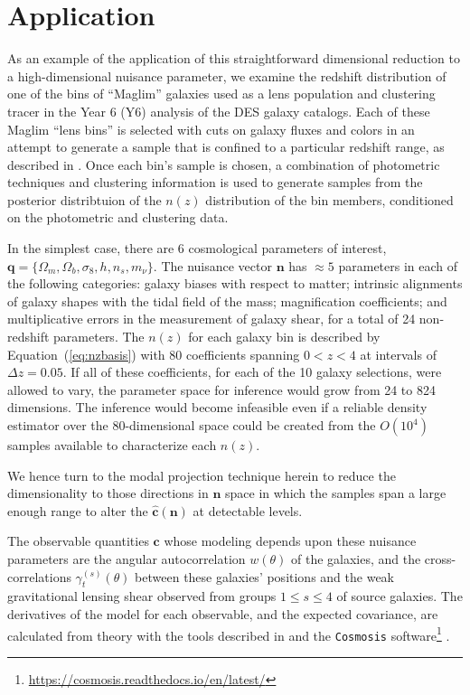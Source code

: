 \documentclass[linenumbers, onecolumn]{aastex63}
\newcommand{\eqq}[1]{Equation~(\ref{#1})}
\newcommand{\vecc}{\ensuremath{\mathbf{c}}}
\newcommand{\vecq}{\ensuremath{\mathbf{q}}}
\newcommand{\vecn}{\ensuremath{\mathbf{n}}}
\newcommand{\hatc}{\ensuremath{\hat{\mathbf{c}}}}
\begin{document}
\section{Application}\label{sec:app}
As an example of the application of this straightforward dimensional
reduction to a high-dimensional nuisance parameter, we examine the
redshift distribution of one of the bins of ``Maglim''  galaxies used
as a lens population and clustering tracer in the Year 6 (Y6) analysis of
the DES galaxy catalogs.  Each of these Maglim ``lens bins''
is selected with cuts on galaxy fluxes and
colors in an attempt to generate a sample that is confined to a
particular redshift range, as described in \citet{y6gg}.  Once each bin's
sample is chosen, a combination of 
photometric techniques \citep{y6pz} and clustering information
\citep{y6wz} is used to generate samples from the posterior
distribtuion of  the $n(z)$ distribution of the bin members, conditioned
on the photometric and clustering data.

In the simplest case,
there are 6 cosmological parameters of interest, $\vecq = \{\Omega_m,
\Omega_b, \sigma_8, h, n_s, m_\nu\}.$   The nuisance vector $\vecn$
has $\approx 5$  parameters in each of the following categories: galaxy
biases with respect to matter; intrinsic alignments of galaxy shapes
with the tidal field of the mass; magnification coefficients; and multiplicative errors in the
measurement of galaxy shear, for a total of 24 non-redshift parameters.  The $n(z)$ for each galaxy bin
is
described by \eqq{eq:nzbasis} with 80 coefficients spanning $0<z<4$ at
intervals of $\Delta z=0.05.$ If all of these coefficients, for each
of the 10 galaxy selections, were allowed to vary, the parameter space for inference would grow from 24 to 824 dimensions.
The inference would become infeasible even if a
reliable density estimator over the 80-dimensional space could be
created from the $O(10^4)$ samples available to characterize each
$n(z).$ 

We hence turn to the modal projection technique herein to reduce the
dimensionality to those directions in $\vecn$ space in which the samples span a large
enough range to alter the $\hatc(\vecn)$ at detectable levels. 

The observable quantities $\vecc$ whose modeling depends upon these nuisance
parameters are the angular autocorrelation $w(\theta)$ of the 
galaxies, and the cross-correlations $\gamma_t^{(s)}(\theta)$ between
these galaxies' positions and the weak gravitational lensing shear
observed from groups $1\le s \le 4$ of source galaxies.  The
derivatives of the model for each observable, and the expected
covariance, are calculated from theory with the tools described in
\citet{y6model} and the \texttt{Cosmosis} software\footnote{\url{https://cosmosis.readthedocs.io/en/latest/}} \citep{cosmosis}.
\end{document}
